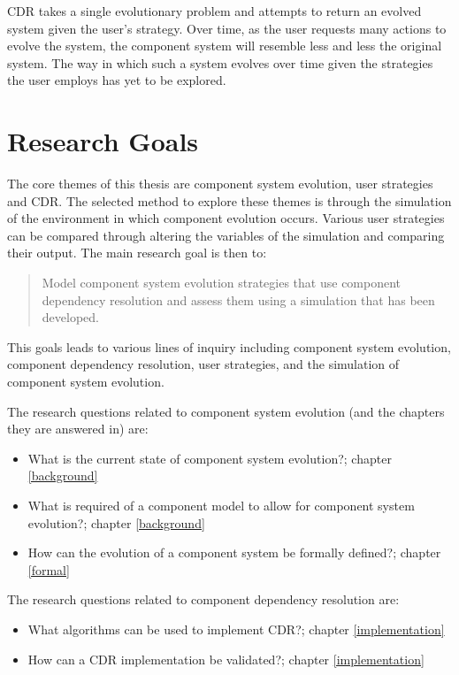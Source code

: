 CDR takes a single evolutionary problem and attempts to return an evolved system given the user's strategy.
Over time, as the user requests many actions to evolve the system, the component system will resemble less and less the original system.
The way in which such a system evolves over time given the strategies the user employs has yet to be explored. 

\section{Research Goals}
The core themes of this thesis are component system evolution, user strategies and CDR.
The selected method to explore these themes is through the simulation of the environment in which component evolution occurs.
Various user strategies can be compared through altering the variables of the simulation and comparing their output.
The main research goal is then to:
\begin{quote}
Model component system evolution strategies that use component dependency resolution and assess them using a simulation that has been developed.
\end{quote}

This goals leads to various lines of inquiry including component system evolution, component dependency resolution, user strategies, and the simulation of component system evolution.

The research questions related to component system evolution (and the chapters they are answered in) are:
\begin{itemize}
	\item What is the current state of component system evolution?; chapter \ref{background}
	\item What is required of a component model to allow for component system evolution?; chapter \ref{background}
	\item How can the evolution of a component system be formally defined?; chapter \ref{formal}
\end{itemize}

The research questions related to component dependency resolution are:
\begin{itemize}
  \item What algorithms can be used to implement CDR?; chapter \ref{implementation}
  \item How can a CDR implementation be validated?; chapter \ref{implementation}
\end{itemize}

